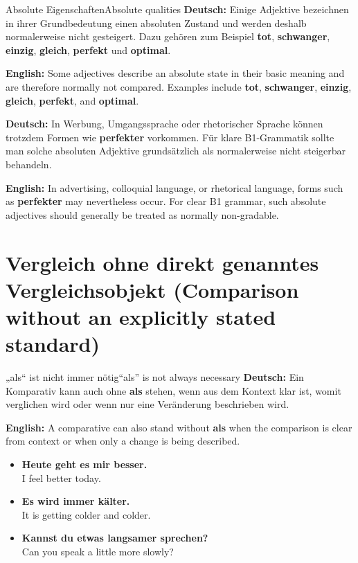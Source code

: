 \documentclass[a4paper,11pt]{article}
\newcommand{\GermanText}[1]{\textbf{Deutsch: }#1\par}
\newcommand{\EnglishText}[1]{{\small\color{SoftGray}\textbf{English: }#1\par}}
\newcommand{\ExampleItem}[2]{\item \textbf{#1}\\{\small\color{SoftGray}#2}}
\begin{document}
      \begin{grammarentry}{Absolute Eigenschaften}{Absolute qualities}
         \GermanText{Einige Adjektive bezeichnen in ihrer Grundbedeutung einen absoluten Zustand und werden deshalb normalerweise nicht gesteigert. Dazu gehören zum Beispiel \textbf{tot}, \textbf{schwanger}, \textbf{einzig}, \textbf{gleich}, \textbf{perfekt} und \textbf{optimal}.}
         \EnglishText{Some adjectives describe an absolute state in their basic meaning and are therefore normally not compared. Examples include \textbf{tot}, \textbf{schwanger}, \textbf{einzig}, \textbf{gleich}, \textbf{perfekt}, and \textbf{optimal}.}

         \GermanText{In Werbung, Umgangssprache oder rhetorischer Sprache können trotzdem Formen wie \textbf{perfekter} vorkommen. Für klare B1-Grammatik sollte man solche absoluten Adjektive grundsätzlich als normalerweise nicht steigerbar behandeln.}
         \EnglishText{In advertising, colloquial language, or rhetorical language, forms such as \textbf{perfekter} may nevertheless occur. For clear B1 grammar, such absolute adjectives should generally be treated as normally non-gradable.}
      \end{grammarentry}

   \section{Vergleich ohne direkt genanntes Vergleichsobjekt \textnormal{(Comparison without an explicitly stated standard)}}

      \begin{grammarentry}{„als“ ist nicht immer nötig}{“als” is not always necessary}
         \GermanText{Ein Komparativ kann auch ohne \textbf{als} stehen, wenn aus dem Kontext klar ist, womit verglichen wird oder wenn nur eine Veränderung beschrieben wird.}
         \EnglishText{A comparative can also stand without \textbf{als} when the comparison is clear from context or when only a change is being described.}
      \end{grammarentry}

      \begin{exbox}
         \begin{itemize}
            \ExampleItem{Heute geht es mir besser.}{I feel better today.}
            \ExampleItem{Es wird immer kälter.}{It is getting colder and colder.}
            \ExampleItem{Kannst du etwas langsamer sprechen?}{Can you speak a little more slowly?}
         \end{itemize}
      \end{exbox}
\end{document}
